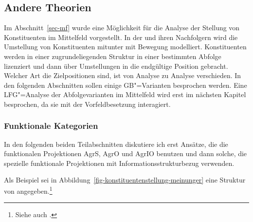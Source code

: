 \subsection{Andere Theorien}
\label{sec-alternativen-konstituentenreihenfolge-gb}

Im Abschnitt~\ref{sec-mf} wurde eine Möglichkeit für die Analyse der Stellung von Konstituenten im Mittelfeld vorgestellt.
In der \gbt und ihren Nachfolgern wird die Umstellung von Konstituenten mitunter mit Bewegung modelliert.
Konstituenten werden in einer zugrundeliegenden Struktur in einer bestimmten Abfolge lizenziert
und dann über Umstellungen in die endgültige Position gebracht. Welcher Art die Zielpositionen sind,
ist von Analyse zu Analyse verschieden. In den folgenden Abschnitten sollen einige GB"=Varianten
besprochen werden. Eine LFG"=Analyse der Abfolgevarianten im Mittelfeld wird erst im nächsten
Kapitel besprochen, da sie mit der Vorfeldbesetzung interagiert.

\subsubsection{Funktionale Kategorien}

In den folgenden beiden Teilabschnitten diskutiere ich erst Ansätze, die die funktionalen Projektionen
AgrS, AgrO und AgrIO benutzen und dann solche, die spezielle funktionale Projektionen 
mit Informationsstrukturbezug verwenden.


%
Als Beispiel sei in Abbildung~\vref{fig-konstituentenstellung-meinunger} eine Struktur von \citet{Meinunger2000a} angegeben.\footnote{
  Siehe auch .%
}

